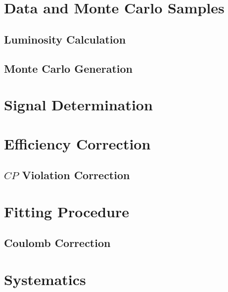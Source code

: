 \section{Data and Monte Carlo Samples}
\label{sec_samples}

\subsection{Luminosity Calculation}
\label{ssec_luminosity}

\subsection{Monte Carlo Generation}
\label{ssec_monte_carlo}


\section{Signal Determination}
\label{sec_signal}


\section{Efficiency Correction}
\label{sec_efficiency}

\subsection{$CP$ Violation Correction}
\label{ssec_cp_correction}


\section{Fitting Procedure}
\label{sec_fitting}

\subsection{Coulomb Correction}
\label{ssec_coulomb}


\section{Systematics}
\label{sec_systematics}


